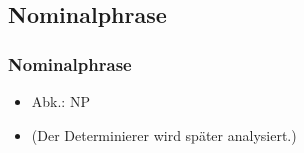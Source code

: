 \subsection{Nominalphrase}

\begin{frame}
\frametitle{Nominalphrase}

\begin{itemize}
	\item Abk.: NP
	\item (Der Determinierer wird später analysiert.)
\end{itemize}

\begin{figure}[b]

	\begin{minipage}[b]{0.13\textwidth}
	\centering
  	\end{minipage}  
  	\pause            
	\begin{minipage}[b]{0.02\textwidth}
	\hfill
  	\end{minipage}
  	\begin{minipage}[b]{0.30\textwidth}
	\centering
  	\end{minipage}  
	\begin{minipage}[b]{0.02\textwidth}
	\hfill
  	\end{minipage}
  	\pause            
	\begin{minipage}[b]{0.41\textwidth}
	\centering
  	\end{minipage}
\end{figure}
\end{frame}


